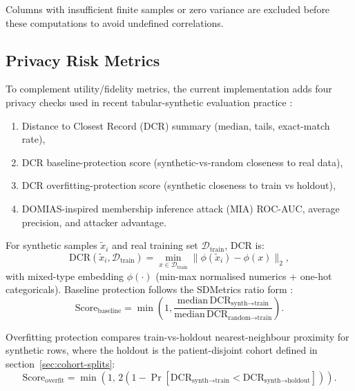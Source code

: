 Columns with insufficient finite samples or zero variance are excluded before these computations to avoid undefined correlations.

\subsection{Privacy Risk Metrics}

To complement utility/fidelity metrics, the current implementation adds four privacy checks used in recent tabular-synthetic evaluation practice \cite{lautrup2024syntheval,breugel2023domias}:
\begin{enumerate}\tightlist
    \item Distance to Closest Record (DCR) summary ($\mathrm{median}$, tails, exact-match rate),
    \item DCR baseline-protection score (synthetic-vs-random closeness to real data),
    \item DCR overfitting-protection score (synthetic closeness to train vs holdout),
    \item DOMIAS-inspired membership inference attack (MIA) ROC-AUC, average precision, and attacker advantage.
\end{enumerate}

For synthetic samples $\tilde{x}_i$ and real training set $\mathcal{D}_{\text{train}}$, DCR is:
\begin{equation}
\mathrm{DCR}(\tilde{x}_i,\mathcal{D}_{\text{train}})=\min_{x\in\mathcal{D}_{\text{train}}}\|\phi(\tilde{x}_i)-\phi(x)\|_2,
\end{equation}
with mixed-type embedding $\phi(\cdot)$ (min-max normalised numerics + one-hot categoricals).
Baseline protection follows the SDMetrics ratio form \cite{sdmetricsPrivacyDocs}:
\begin{equation}
\mathrm{Score}_{\text{baseline}}=\min\left(1,\frac{\mathrm{median}\,\mathrm{DCR}_{\text{synth}\rightarrow\text{train}}}{\mathrm{median}\,\mathrm{DCR}_{\text{random}\rightarrow\text{train}}}\right).
\end{equation}

Overfitting protection compares train-vs-holdout nearest-neighbour proximity for synthetic rows, where the holdout is the patient-disjoint  cohort defined in section~\ref{sec:cohort-splits}:
\begin{equation}
\mathrm{Score}_{\text{overfit}}=\min\left(1,\,2\left(1-\Pr\left[\mathrm{DCR}_{\text{synth}\rightarrow\text{train}} < \mathrm{DCR}_{\text{synth}\rightarrow\text{holdout}}\right]\right)\right).
\end{equation}

